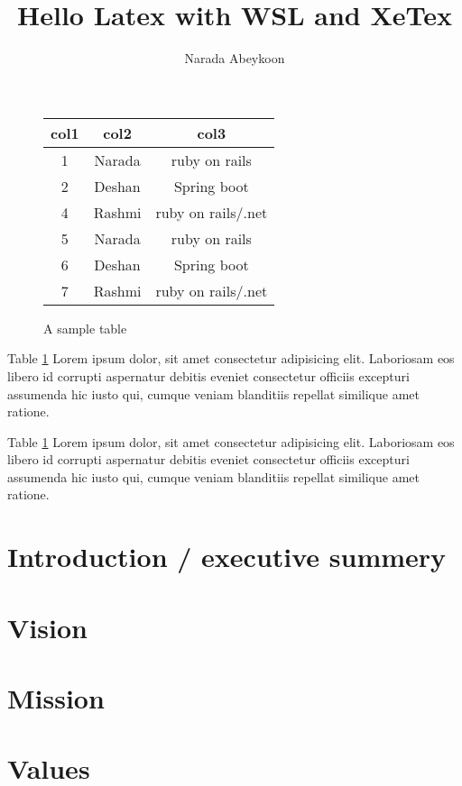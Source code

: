 \documentclass[12pt]{article}
\title{Hello Latex with WSL and XeTex}
\author{Narada Abeykoon}
\begin{document}
\maketitle
\tableofcontents
\clearpage



\begin{figure}[h]
    \begin{center}
        \begin{tabular}{|c|c|c|}
            \hline
            col1 & col2   & col3               \\
            \hline
            1    & Narada & ruby on rails      \\
            2    & Deshan & Spring boot        \\
            4    & Rashmi & ruby on rails/.net \\
            5    & Narada & ruby on rails      \\
            6    & Deshan & Spring boot        \\
            7    & Rashmi & ruby on rails/.net \\
            \hline
        \end{tabular}
    \end{center}
    \caption{A sample table}
    \label{table1}
\end{figure}

Table \ref{table1} Lorem ipsum dolor, sit amet consectetur adipisicing elit. Laboriosam eos libero id corrupti aspernatur debitis eveniet consectetur officiis excepturi assumenda hic iusto qui, cumque veniam blanditiis repellat similique amet ratione.

Table \ref{table1} Lorem ipsum dolor, sit amet consectetur adipisicing elit. Laboriosam eos libero id corrupti aspernatur debitis eveniet consectetur officiis excepturi assumenda hic iusto qui, cumque veniam blanditiis repellat similique amet ratione.

\clearpage
\section{Introduction / executive summery}
\section{Vision}
\section{Mission}
\section{Values}
\clearpage
\end{document}
